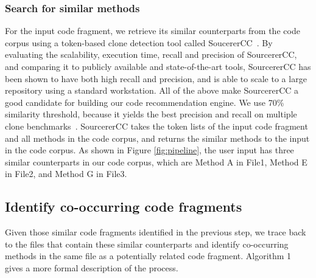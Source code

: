 \subsubsection{Search for similar methods}
For the input code fragment, we retrieve its similar counterparts from the code corpus using a token-based clone detection tool called SoucererCC~\cite{sajnani2016sourcerercc}. By evaluating the scalability, execution time, recall and precision of SourcererCC, and comparing it to publicly available and state-of-the-art tools, SourcererCC has been shown to have both high recall and precision, and is able to scale to a large repository using a standard workstation. All of the above make SourcererCC a good candidate for building our code recommendation engine. 
We use 70\% similarity threshold, because it yields the best precision and recall on multiple clone benchmarks~\cite{sajnani2016sourcerercc}. SourcererCC takes the token lists of the input code fragment and all methods in the code corpus, and returns the similar methods to the input in the code corpus. As shown in Figure \ref{fig:pipeline}, the user input has three similar counterparts in our code corpus, which are {\ttt Method A} in {\ttt File1}, {\ttt Method E} in {\ttt File2}, and {\ttt Method G} in {\ttt File3}.

\subsection{Identify co-occurring code fragments}
Given those similar code fragments identified in the previous step, we trace back to the files that contain these similar counterparts and identify co-occurring methods in the same file as a potentially related code fragment. Algorithm 1 gives a more formal description of the process.

